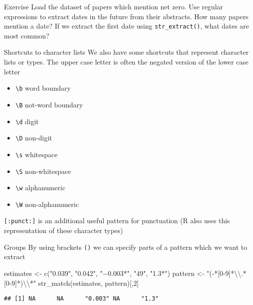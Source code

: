 \documentclass[
  10pt,
  ignorenonframetext,
  aspectratio=169]{beamer}
\newenvironment{Shaded}{\begin{snugshade}}{\end{snugshade}}
\newcommand{\DecValTok}[1]{\textcolor[rgb]{0.86,0.86,0.80}{#1}}
\newcommand{\FunctionTok}[1]{\textcolor[rgb]{0.94,0.94,0.56}{#1}}
\newcommand{\NormalTok}[1]{\textcolor[rgb]{0.80,0.80,0.80}{#1}}
\newcommand{\OtherTok}[1]{\textcolor[rgb]{0.94,0.94,0.56}{#1}}
\newcommand{\SpecialCharTok}[1]{\textcolor[rgb]{0.86,0.64,0.64}{#1}}
\newcommand{\StringTok}[1]{\textcolor[rgb]{0.80,0.58,0.58}{#1}}
\providecommand{\tightlist}{%
  \setlength{\itemsep}{0pt}\setlength{\parskip}{0pt}}
\begin{document}
\begin{frame}[fragile]{Exercise}
\protect\hypertarget{exercise}{}
Load the dataset of papers which mention net zero. Use regular
expressions to extract dates in the future from their abstracts. How
many papers mention a date? If we extract the first date using
\texttt{str\_extract()}, what dates are most common?
\end{frame}

\begin{frame}[fragile]{Shortcuts to character lists}
\protect\hypertarget{shortcuts-to-character-lists}{}
We also have some shortcuts that represent character lists or types. The
upper case letter is often the negated version of the lower case letter

\begin{itemize}
\tightlist
\item
  \texttt{\textbackslash{}b} word boundary
\item
  \texttt{\textbackslash{}B} not-word boundary
\item
  \texttt{\textbackslash{}d} digit
\item
  \texttt{\textbackslash{}D} non-digit
\item
  \texttt{\textbackslash{}s} whitespace
\item
  \texttt{\textbackslash{}S} non-whitespace
\item
  \texttt{\textbackslash{}w} alphanumeric
\item
  \texttt{\textbackslash{}W} non-alphanumeric
\end{itemize}

\texttt{{[}:punct:{]}} is an additional useful pattern for punctuation
(R also uses this representation of these character types)
\end{frame}

\begin{frame}[fragile]{Groups}
\protect\hypertarget{groups}{}
By using brackets \texttt{()} we can specify parts of a pattern which we
want to extract

\begin{Shaded}
\begin{Highlighting}[]
\NormalTok{estimates }\OtherTok{\textless{}{-}} \FunctionTok{c}\NormalTok{(}\StringTok{"0.039"}\NormalTok{, }\StringTok{"0.042"}\NormalTok{, }\StringTok{"−0.003*"}\NormalTok{, }\StringTok{"49"}\NormalTok{, }\StringTok{"1.3*"}\NormalTok{)}
\NormalTok{pattern }\OtherTok{\textless{}{-}} \StringTok{"({-}*[0{-}9]*}\SpecialCharTok{\textbackslash{}\textbackslash{}}\StringTok{.*[0{-}9]*)}\SpecialCharTok{\textbackslash{}\textbackslash{}}\StringTok{*"}
\FunctionTok{str\_match}\NormalTok{(estimates, pattern)[,}\DecValTok{2}\NormalTok{]}
\end{Highlighting}
\end{Shaded}

\begin{verbatim}
## [1] NA      NA      "0.003" NA      "1.3"
\end{verbatim}
\end{frame}
\end{document}
